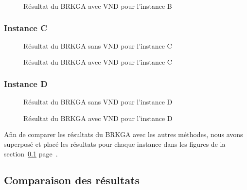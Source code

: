                 \begin{figure}[H]
                    
                \caption{Résultat du BRKGA avec VND pour l'instance B}
                \label{fig:20m3i3d-avecvnd}
                \end{figure}
                
            \subsubsection{Instance C}
                \begin{figure}[H]
                    
                \caption{Résultat du BRKGA sans VND pour l'instance C}
                \label{fig:30m4i3d-sansvnd}
                \end{figure}
                
                \begin{figure}[H]
                    
                \caption{Résultat du BRKGA avec VND pour l'instance C}
                \label{fig:30m4i3d-avecvnd}
                \end{figure}
                
            \subsubsection{Instance D}
                \begin{figure}[H]
                    
                \caption{Résultat du BRKGA sans VND pour l'instance D}
                \label{fig:40m5i4d-sansvnd}
                \end{figure}
                
                \begin{figure}[H]
                    
                \caption{Résultat du BRKGA avec VND pour l'instance D}
                \label{fig:40m5i4d-avecvnd}
                \end{figure}
            Afin de comparer les résultats du BRKGA avec les autres méthodes, nous avons superposé et placé les résultats pour chaque instance dans les figures de la section~\ref{subs:comparison} page~\pageref{subs:comparison}.

        \subsection{Comparaison des résultats}
        \label{subs:comparison}


